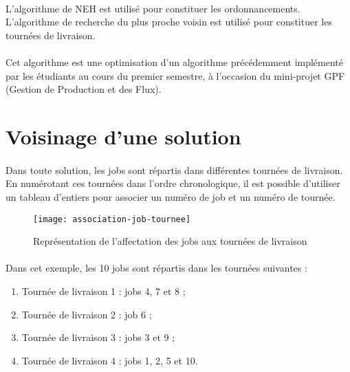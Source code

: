 \paragraph{}
L'algorithme de NEH est utilisé pour constituer les ordonnancements.
L'algorithme de recherche du plus proche voisin est utilisé pour constituer les tournées de livraison.

\paragraph{}
Cet algorithme est une optimisation d'un algorithme précédemment implémenté par les étudiants au cours du premier semestre,
à l'occasion du mini-projet GPF (Gestion de Production et des Flux).


\section{Voisinage d'une solution}

\paragraph{}
Dans toute solution, les jobs sont répartis dans différentes tournées de livraison.
En numérotant ces tournées dans l'ordre chronologique, il est possible d'utiliser un tableau d'entiers
pour associer un numéro de job et un numéro de tournée.

\begin{figure}[H] %
\centering
\texttt{[image: association-job-tournee]}
\caption{\label{fig:association-job-tournee}Représentation de l'affectation des jobs aux tournées de livraison}
\end{figure}

\paragraph{}
Dans cet exemple, les 10 jobs sont répartis dans les tournées suivantes :
\begin{enumerate}
\item Tournée de livraison 1 : jobs 4, 7 et 8 ;
\item Tournée de livraison 2 : job 6 ;
\item Tournée de livraison 3 : jobs 3 et 9 ;
\item Tournée de livraison 4 : jobs 1, 2, 5 et 10.
\end{enumerate}

